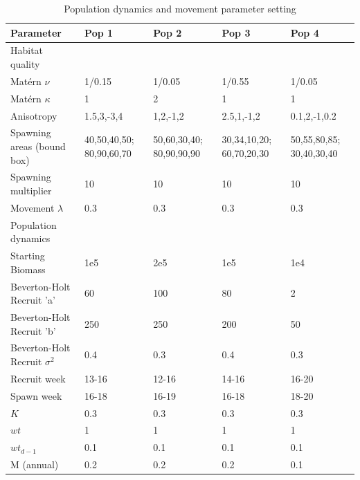 \documentclass[review]{elsarticle}
\begin{document}
\begin{table}[!ht]
\caption{Population dynamics and movement parameter setting}
	\begin{tabular}{ p{4cm } p{2cm} p{2cm} p{2cm} p{2cm}}
	Parameter & Pop 1 & Pop 2 & Pop 3 & Pop 4 \\
	\hline
	Habitat quality & & & \\
	\hline
	Matérn $\nu$ & 1/0.15 & 1/0.05 & 1/0.55 & 1/0.05  \\
	Matérn $\kappa$ & 1 & 2 & 1 & 1  \\
	Anisotropy & 1.5,3,-3,4 & 1,2,-1,2 & 2.5,1,-1,2 & 0.1,2,-1,0.2 \\
	Spawning areas (bound box) & 40,50,40,50; 80,90,60,70 &
	50,60,30,40; 80,90,90,90 & 30,34,10,20; 60,70,20,30 & 50,55,80,85; 30,40,30,40 \\
	Spawning multiplier & 10 & 10 & 10 & 10 \\
	Movement $\lambda$ & 0.3 & 0.3 & 0.3 & 0.3 \\
	\hline
	Population dynamics & & & & \\
	\hline
	Starting Biomass & 1e5 & 2e5 & 1e5 & 1e4 \\
	Beverton-Holt Recruit 'a' & 60 & 100 & 80 & 2 \\
	Beverton-Holt Recruit 'b' & 250 & 250 & 200 & 50 \\
	Beverton-Holt Recruit $\sigma^2$ & 0.4 & 0.3 & 0.4 & 0.3 \\
	Recruit week & 13-16 & 12-16 & 14-16 & 16-20 \\
	Spawn week & 16-18 & 16-19 & 16-18 & 18-20 \\
	$K$ & 0.3 & 0.3 & 0.3 & 0.3 \\
	$wt$ & 1 & 1 & 1 & 1 \\
	$wt_{d-1}$ & 0.1 & 0.1 & 0.1 & 0.1 \\
	M (annual) & 0.2 & 0.2 & 0.2 & 0.1 \\
	\hline
\end{tabular}
\label{tab:1}
\end{table}
\end{document}
